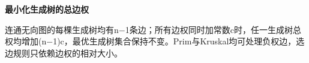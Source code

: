 {\color{ink}\bfseries 最小化生成树的总边权}\par\vspace{1bp}连通无向图的每棵生成树均有n\(-\)1条边；所有边权同时加常数c时，任一生成树总权均增加(n\(-\)1)c，最优生成树集合保持不变。Prim与Kruskal均可处理负权边，选边规则只依赖边权的相对大小。
